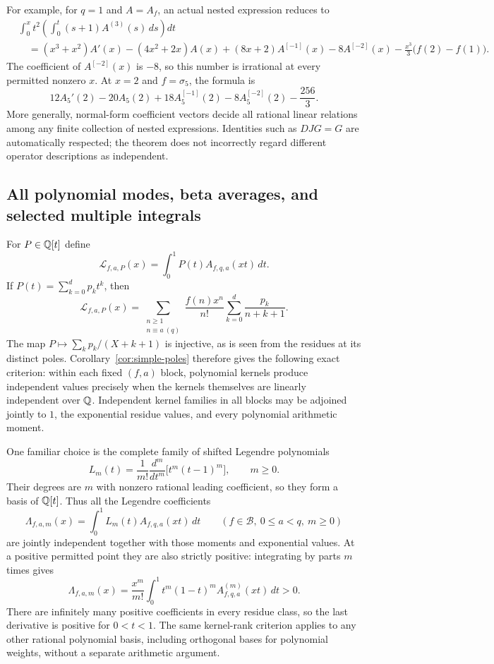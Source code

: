 For example, for $q=1$ and $A=A_f$, an actual nested expression reduces to
\begin{align*}
 &\int_0^x t^2\left(\int_0^t(s+1)A^{(3)}(s)\,ds\right)dt\\
 &\quad=(x^3+x^2)A'(x)-(4x^2+2x)A(x)
       +(8x+2)A^{[-1]}(x)-8A^{[-2]}(x)
       -\frac{x^3}{3}\bigl(f(2)-f(1)\bigr).
\end{align*}
The coefficient of $A^{[-2]}(x)$ is $-8$, so this number is irrational
at every permitted nonzero $x$.  At $x=2$ and $f=\sigma_5$, the formula is
\[
 12A_5'(2)-20A_5(2)+18A_5^{[-1]}(2)-8A_5^{[-2]}(2)-\frac{256}{3}.
\]
More generally, normal-form coefficient vectors decide all rational
linear relations among any finite collection of nested expressions.
Identities such as $DJG=G$ are automatically respected; the theorem does
not incorrectly regard different operator descriptions as independent.

\subsection{All polynomial modes, beta averages, and selected multiple integrals}

For $P\in\mathbb Q[t]$ define
\[
 \mathcal L_{f,a,P}(x)=\int_0^1P(t)A_{f,q,a}(xt)\,dt.
\]
If $P(t)=\sum_{k=0}^d p_kt^k$, then
\begin{equation}\label{eq:kernel-rational-weight}
 \mathcal L_{f,a,P}(x)=
 \sum_{\substack{n\geq1\\n\equiv a\ (q)}}
 \frac{f(n)x^n}{n!}\sum_{k=0}^d\frac{p_k}{n+k+1}.
\end{equation}
The map $P\mapsto\sum_kp_k/(X+k+1)$ is injective, as is seen from
the residues at its distinct poles.  Corollary~\ref{cor:simple-poles}
therefore gives the following exact criterion: within each fixed $(f,a)$
block, polynomial kernels produce independent values precisely when the
kernels themselves are linearly independent over $\mathbb Q$.  Independent
kernel families in all blocks may be adjoined jointly to $1$, the
exponential residue values, and every polynomial arithmetic moment.

One familiar choice is the complete family of shifted Legendre polynomials
\[
 L_m(t)=\frac1{m!}\frac{d^m}{dt^m}\bigl[t^m(t-1)^m\bigr],
 \qquad m\geq0.
\]
Their degrees are $m$ with nonzero rational leading coefficient, so they
form a basis of $\mathbb Q[t]$.  Thus all the Legendre coefficients
\[
 \Lambda_{f,a,m}(x)=\int_0^1L_m(t)A_{f,q,a}(xt)\,dt
 \qquad(f\in\mathcal B,\ 0\leq a<q,\ m\geq0)
\]
are jointly independent together with those moments and exponential
values.  At a positive permitted point they are also strictly positive:
integrating by parts $m$ times gives
\[
 \Lambda_{f,a,m}(x)=\frac{x^m}{m!}
   \int_0^1t^m(1-t)^m A_{f,q,a}^{(m)}(xt)\,dt>0.
\]
There are infinitely many positive coefficients in every residue class,
so the last derivative is positive for $0<t<1$.  The same kernel-rank
criterion applies to any other rational polynomial basis, including
orthogonal bases for polynomial weights, without a separate arithmetic
argument.

